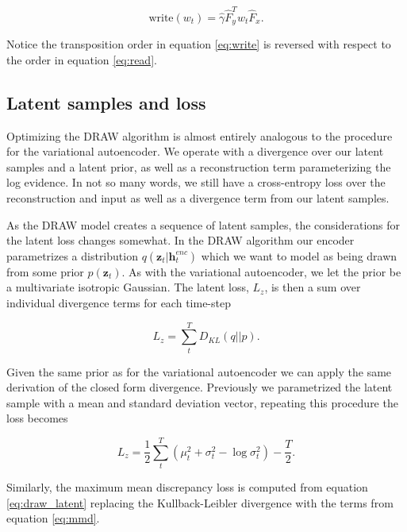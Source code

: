 \begin{equation}\label{eq:write}
\text{write}(w_t)  = \hat{\gamma} \hat{F}^T_y w_t \hat{F}_x.
\end{equation}

\noindent Notice the transposition order in equation \ref{eq:write} is reversed with respect to the order in equation \ref{eq:read}. 

\subsection{Latent samples and loss}

Optimizing the DRAW algorithm is almost entirely analogous to the procedure for the variational autoencoder. We operate with a divergence over our latent samples and a latent prior, as well as a reconstruction term parameterizing the log evidence. In not so many words, we still have a cross-entropy loss over the reconstruction and input as well as a divergence term from our latent samples.  

As the DRAW model creates a sequence of latent samples, the considerations for the latent loss changes somewhat. In the DRAW algorithm our encoder parametrizes a distribution $q(\boldsymbol{z}_t | \boldsymbol{h}_t^{enc})$ which we want to model as being drawn from some prior $p(\boldsymbol{z}_t)$. As with the variational autoencoder, we let the prior be a multivariate isotropic Gaussian. The latent loss, $L_z$, is then a sum over individual divergence terms for each time-step

\begin{equation}\label{eq:draw_latent}
L_z = \sum_t^T D_{KL}(q||p).
\end{equation}

\noindent Given the same prior as for the variational autoencoder we can apply the same derivation of the closed form divergence. Previously we parametrized the latent sample with a mean and standard deviation vector, repeating this procedure the loss becomes 

\begin{equation}\label{eq:draw_kl}
L_z = \frac{1}{2}\sum_t^T(\mu^2_t + \sigma^2_t - \log \sigma_t ^2) - \frac{T}{2}.
\end{equation}

\noindent Similarly, the maximum mean discrepancy loss is computed from equation \ref{eq:draw_latent} replacing the Kullback-Leibler divergence with the terms from equation \ref{eq:mmd}.